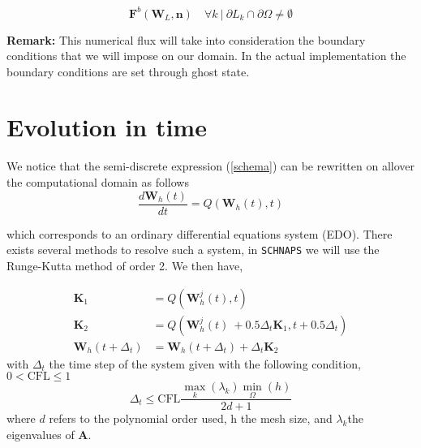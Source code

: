 \documentclass[a4paper,oneside,10pt]{report}
\begin{document}
\begin{equation}
\mathbf{F}^b( \mathbf{W}_L,\mathbf{n}) \quad \forall k\ | \ \partial L_k \cap \partial \Omega \neq \emptyset
\end{equation}



\textbf{Remark:} This numerical flux will take into consideration the boundary conditions that we will impose on our domain. In the actual implementation the boundary conditions are set through ghost state.



\section{Evolution in time}


We notice that the semi-discrete expression (\ref{schema}) can be rewritten on allover the computational domain as follows
\begin{equation}
\frac{d\mathbf{W}_{h}(t)}{dt} = Q\left(\mathbf{W}_{h}(t),t\right)
\end{equation}

which corresponds to an ordinary differential equations system (EDO). There exists several methods to resolve such a system, in \texttt{SCHNAPS} we will use the Runge-Kutta method of order 2. We then have,

\begin{equation}
\begin{aligned}
\mathbf{K}_1 &= Q\left(\mathbf{W}_{h}^j(t),t\right)\\
\mathbf{K}_2 &= Q\left(\mathbf{W}_{h}^j(t)\ + 0.5\Delta_t\mathbf{K}_1 ,t + 0.5\Delta_t \right)\\
\mathbf{W}_{h}(t+\Delta_t) &= \mathbf{W}_{h}(t+\Delta_t) + \Delta_t\mathbf{K}_2
\end{aligned}
\end{equation}
with $\Delta_t$ the time step of the system given with the following condition, $0 < \mathrm{CFL} \leq 1$ 
\begin{equation}
\Delta_t \leq \mathrm{CFL} \frac{\max\limits_k(\lambda_k) \min\limits_\Omega (h)}{2d+1}
\end{equation}
where $d$ refers to the polynomial order used, h the mesh size, and $\lambda_k$the eigenvalues of $\mathbf{A}$.
\end{document}
